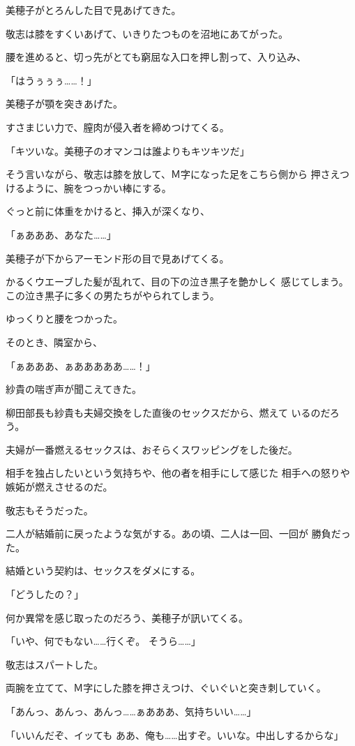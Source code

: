﻿\documentclass[
    book,tate,
    line_length=30zw,
    jafontsize=12pt,
    paper=b5j,
    landscape,
    ]{jlreq}
\begin{document}
美穂子がとろんした目で見あげてきた。

敬志は膝をすくいあげて、いきりたつものを沼地にあてがった。

腰を進めると、切っ先がとても窮屈な入口を押し割って、入り込み、

「はうぅぅぅ……！」

美穂子が顎を突きあげた。

すさまじい力で、膣肉が侵入者を締めつけてくる。

「キツいな。美穂子のオマンコは誰よりもキツキツだ」

そう言いながら、敬志は膝を放して、Ｍ字になった足をこちら側から
押さえつけるように、腕をつっかい棒にする。

ぐっと前に体重をかけると、挿入が深くなり、

「ぁあああ、あなた……」

美穂子が下からアーモンド形の目で見あげてくる。

かるくウエーブした髪が乱れて、目の下の泣き黒子を艶かしく
感じてしまう。この泣き黒子に多くの男たちがやられてしまう。

ゆっくりと腰をつかった。

そのとき、隣室から、

「ぁあああ、ぁあああああ……！」

紗貴の喘ぎ声が聞こえてきた。

柳田部長も紗貴も夫婦交換をした直後のセックスだから、燃えて
いるのだろう。

夫婦が一番燃えるセックスは、おそらくスワッピングをした後だ。

相手を独占したいという気持ちや、他の者を相手にして感じた
相手への怒りや嫉妬が燃えさせるのだ。

敬志もそうだった。

二人が結婚前に戻ったような気がする。あの頃、二人は一回、一回が
勝負だった。

結婚という契約は、セックスをダメにする。

「どうしたの？」

何か異常を感じ取ったのだろう、美穂子が訊いてくる。

「いや、何でもない……行くぞ。 そうら……」

敬志はスパートした。

両腕を立てて、Ｍ字にした膝を押さえつけ、ぐいぐいと突き刺していく。

「あんっ、あんっ、あんっ……ぁあああ、気持ちいい……」

「いいんだぞ、イッても ああ、俺も……出すぞ。いいな。中出しするからな」
\end{document}
